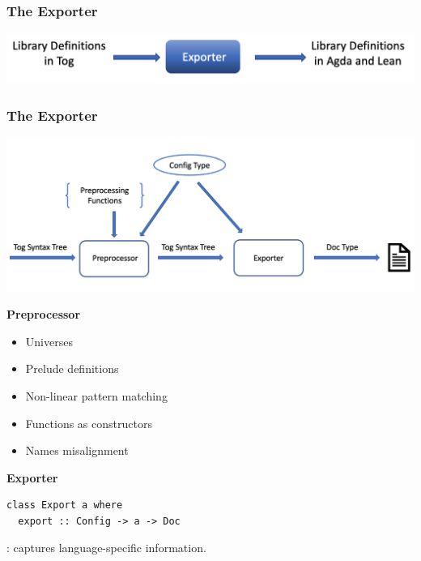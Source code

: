 \documentclass[t,10pt,numbers,fleqn,usenames,xcolor=dvipsnames]{beamer}
\begin{document}
\begin{frame}[fragile] 
\frametitle{The Exporter} 
\begin{center}
\includegraphics[scale=0.25]{figures/exporter.png}
\end{center} 
\end{frame}

\begin{frame}[fragile] 
\frametitle{The Exporter} 
\includegraphics[scale=0.2]{../figures/exporter_arch.png}
\begin{overprint}
\textbf{Preprocessor}
\begin{itemize}
\item Universes 
\item Prelude definitions 
\item Non-linear pattern matching 
\item Functions as constructors
\item Names misalignment  
\end{itemize}
\textbf{Exporter}
\begin{verbatim} 
class Export a where
  export :: Config -> a -> Doc
\end{verbatim} 
: captures language-specific information. 
\end{overprint}
\end{frame}
\end{document}
